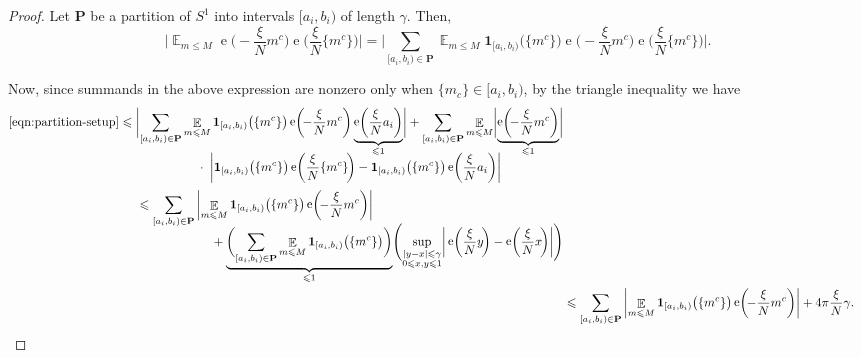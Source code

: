 \documentclass[letterpaper, 12pt]{article}
\theoremstyle{plain}
\theoremstyle{definition}
\theoremstyle{plain}
\theoremstyle{plain}
\numberwithin{equation}{section}
\renewcommand{\leq}{\leqslant}
\newcommand{\E}{\mathbb{E}}
\newcommand{\1}{\textbf{1}}
\DeclareMathOperator{\e}{e}
\begin{document}
\begin{proof}
    Let \(\textbf{P}\) be a partition of \(S^1\) into intervals \([a_i, b_i)\) of length \(\gamma\). Then,
    \begin{equation}\label{eqn:partition-setup}
        \biggl\lvert \mathop{\E}_{m \leq M} \e\biggl(\! -\frac{\xi}{N} m^c \biggr) \e\biggl(\frac{\xi}{N} \{m^c\} \!\biggr) \biggr\rvert
        = \biggl\lvert \sum_{[a_i, b_i) \in \textbf{P}} \mathop{\E}_{m \leq M} \1_{[a_i, b_i)}\bigl(\{m^c\}\bigr) \e\biggl(\! -\frac{\xi}{N} m^c \biggr) \e\biggl(\frac{\xi}{N} \{m^c\} \!\biggr) \biggr\rvert.
    \end{equation}
    
    Now, since summands in the above expression are nonzero only when \(\{m_c\} \in [a_i, b_i)\), by the triangle inequality we have
    \begin{align}
        \begin{split}\nonumber
            \eqref{eqn:partition-setup} &\leq \biggl\lvert \sum_{[a_i, b_i) \in \textbf{P}} \mathop{\E}_{m \leq M} \1_{[a_i, b_i)}\bigl(\{m^c\}\bigr) \e\biggl(\! -\frac{\xi}{N} m^c \biggr)
            \underbrace{\e\biggl(\frac{\xi}{N} a_i \biggr)}_{\leq 1} \biggr\rvert
            + \sum_{[a_i, b_i) \in \textbf{P}} \mathop{\E}_{m \leq M}
            \biggl\lvert
            \underbrace{\e\biggl(\! -\frac{\xi}{N} m^c\biggr)}_{\leq 1}\biggr\rvert\\[-0.7em]
            &\qquad\qquad\qquad\; \cdot\; \biggl\lvert \1_{[a_i, b_i)}\bigl(\{m^c\}\bigr) \e\biggl(\frac{\xi}{N} \{m^c\} \!\biggr) - \1_{[a_i, b_i)}\bigl(\{m^c\}\bigr) \e\biggl(\frac{\xi}{N} a_i \biggr) \biggr\rvert
        \end{split}\\[.2em]
        \begin{split}\nonumber
            &\leq \sum_{[a_i, b_i) \in \textbf{P}}\, \biggl\lvert \mathop{\E}_{m \leq M} \1_{[a_i, b_i)}\bigl(\{m^c\}\bigr) \e\biggl(\! -\frac{\xi}{N} m^c \biggr) \biggr\rvert\\[-0.7em]
            &\qquad\qquad\qquad + \underbrace{\biggl(\sum_{[a_i, b_i) \in \textbf{P}} \mathop{\E}_{m \leq M} \1_{[a_i, b_i)}\bigl(\{m^c\}\bigr) \biggr)}_{\leq 1}
            \Biggl(\sup_{\substack{\lvert y - x \rvert \leq \gamma \\ 0 \leq x, y \leq 1}} \biggl\lvert \, \e\biggl(\frac{\xi}{N} y \!\biggr) - \e\biggl(\frac{\xi}{N} x \!\biggr) \biggr\rvert \Biggr)
        \end{split}\\
            &\leq \sum_{[a_i, b_i) \in \textbf{P}}\, \biggl\lvert \mathop{\E}_{m \leq M} \1_{[a_i, b_i)}\bigl(\{m^c\}\bigr) \e\biggl(\! -\frac{\xi}{N} m^c \biggr) \biggr\rvert + 4\pi\frac{\xi}{N} \gamma. \label{eqn:partition-sum}
    \end{align}
\end{proof}
\end{document}

